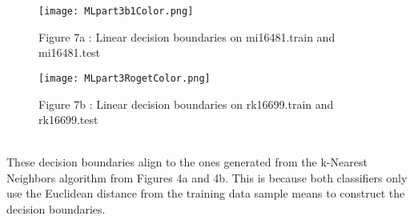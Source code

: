                                                                                         \begin{wrapfigure}{}{\textwidth}
                                                                                          \begin{center}
                                                                                              \texttt{[image: MLpart3b1Color.png]}
                                                                                                  \caption{Figure 7a : Linear decision boundaries on mi16481.train and mi16481.test}
                                                                                                  \end{center}
                                                                                                  \end{wrapfigure}

                                                                                                  \begin{wrapfigure}{}{\textwidth}
                                                                                                    \begin{center}
                                                                                                        \texttt{[image: MLpart3RogetColor.png]}
                                                                                                            \caption{Figure 7b : Linear decision boundaries on rk16699.train and rk16699.test}
                                                                                                            \end{center}
                                                                                                            \end{wrapfigure}
                                                                                                            \\
                                                                                                            These decision boundaries align to the ones generated from the k-Nearest Neighbors algorithm from Figures 4a and 4b. This is because both classifiers only use the Euclidean distance from the training data sample means to construct the decision boundaries.  


